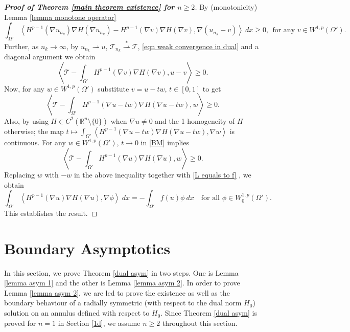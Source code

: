 \documentclass[11pt]{amsart}
\newcommand{\rn}{\mathbb{R}^{n}}
\newcommand{\Fin}[1]{H^{p-1}(\nabla #1)\nabla H(\nabla #1)}
\numberwithin{equation}{section}
\begin{document}
\begin{proof}[\textbf{Proof of Theorem \ref{main theorem existence} for $n\geq 2$}]
    By (monotonicity) Lemma \ref{lemma monotone operator}
    \begin{equation*}
        \int_{\Omega'} \left<\Fin{u_{n_{k}}}-\Fin{v}, \nabla(u_{n_{k}}-v) \right> \ dx \geq 0, ~~ \text{for any } v \in W^{1,p}(\Omega').
   \end{equation*}
   Further, as $n_{k}\to \infty$, by $u_{n_{k}}\rightharpoonup u$, $\mathcal{T}_{n_{k}}\overset{*}\rightharpoonup \mathcal{T}$, \eqref{eqn weak convergence in dual} and a diagonal argument we obtain    
   \begin{equation*}
       \left<\mathcal{T}-\int_{\Omega'}\Fin{v}, u-v\right>\geq 0.
   \end{equation*}
   Now, for any $w\in W^{1,p}(\Omega')$ substitute $v=u-tw$, $t\in [0,1]$ to get 
   \begin{equation}\label{BM}
       \left<\mathcal{T}-\int_{\Omega'}\Fin{u-tw}, w\right>\geq 0.
   \end{equation}
   Also, by using $H\in C^{2}(\rn\setminus\{0\})$ when $\nabla u\neq 0$ and the 1-homogeneity of $H$ otherwise; the map $t\longmapsto \int_{\Omega'}\left<\Fin{u-tw}, \nabla w\right>$ is  continuous. For any $w\in W^{1,p}(\Omega')$, $t\to 0$ in \eqref{BM} implies 
   \begin{equation*}
       \left<\mathcal{T}-\int_{\Omega'}\Fin{u}, w\right>\geq 0.
   \end{equation*}
   Replacing $w$ with $-w$ in the above inequality together with \eqref{L equals to f} , we obtain 
   \begin{equation}
       \int_{\Omega'}\left<\Fin{u}, \nabla \phi \right>\ dx = -\int_{\Omega'}f(u)\phi \ dx \quad \text{for all } \phi\in W_{0}^{1,p}(\Omega').
   \end{equation}
   This establishes the result.
\end{proof}

\section{Boundary Asymptotics}\label{asym}
In this section, we prove Theorem \ref{dual asym} in two steps. One is Lemma \ref{lemma asym 1} and the other is Lemma \ref{lemma asym 2}. In order to prove Lemma \ref{lemma asym 2}, we are led to prove the existence as well as the boundary behaviour of a radially symmetric (with respect to the dual norm ${H_{0}}$) solution on an annulus defined with respect to $H_{0}$. Since Theorem \ref{dual asym} is proved for $n=1$ in Section \ref{1d}, we assume $n\geq 2$ throughout this section.
\end{document}
